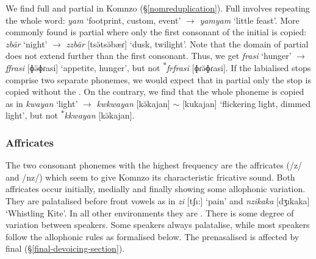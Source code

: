 We find full and partial  in Komnzo (\S{}\ref{nomreduplication}). Full  involves repeating the whole word: \emph{yam} `footprint, custom, event' $\rightarrow$ \emph{yamyam} `little feast'. More commonly found is partial  where only the first consonant of the initial  is copied: \emph{zbär} `night' $\rightarrow$ \emph{zzbär} [tsə̆tsə̆bæɾ] `dusk, twilight'. Note that the domain of partial  does not extend further than the first consonant. Thus, we get \emph{frasi} `hunger' $\rightarrow$ \emph{ffrasi} [ɸə̆ɸɾasi] `appetite, hunger', but not \textsuperscript{$\ast$}\emph{frfrasi} [ɸɾə̆ɸɾasi]. If the labialised  stops comprise two separate phonemes, we would expect that in partial  only the  stop is copied without the . On the contrary, we find that the whole phoneme is copied as in \emph{kwayan} `light' $\rightarrow$ \emph{kwkwayan} [kə̆kajan] $\sim$ [kukajan] `flickering light, dimmed light', but not \textsuperscript{$\ast$}\emph{kkwayan} [kə̆kajan].\\

\subsubsection{Affricates} \label{affricates}

The two consonant phonemes with the highest frequency are the affricates (/z/ and /nz/) which seem to give Komnzo its characteristic fricative sound. Both affricates occur initially, medially and finally showing some allophonic variation. They are palatalised before front vowels as in \emph{zi} [tʃı:] `pain' and \emph{nzikaka} [dʒıkaka] `Whistling Kite'. In all other environments they are . There is some degree of variation between speakers. Some speakers always palatalise, while most speakers follow the allophonic rules as formalised below. The prenasalised  is affected by final  (\S{}\ref{final-devoicing-section}).\\

